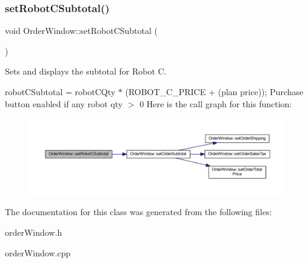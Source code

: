 \subsubsection{\texorpdfstring{set\+Robot\+C\+Subtotal()}{setRobotCSubtotal()}}
{\footnotesize\ttfamily void Order\+Window\+::set\+Robot\+C\+Subtotal (\begin{DoxyParamCaption}{ }\end{DoxyParamCaption})}



Sets and displays the subtotal for Robot C. 

robot\+C\+Subtotal = robot\+C\+Qty $\ast$ (R\+O\+B\+O\+T\+\_\+\+C\+\_\+\+P\+R\+I\+CE + (plan price)); Purchase button enabled if any robot qty $>$ 0 Here is the call graph for this function\+:\nopagebreak
\begin{figure}[H]
\begin{center}
\leavevmode
\includegraphics[width=350pt]{class_order_window_a5283f60b1a3076038b08160b37542fdc_cgraph}
\end{center}
\end{figure}


The documentation for this class was generated from the following files\+:\begin{DoxyCompactItemize}
\item 
order\+Window.\+h\item 
order\+Window.\+cpp\end{DoxyCompactItemize}
